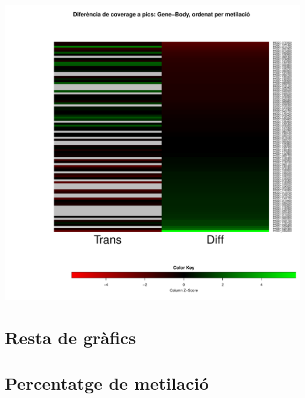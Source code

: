 \documentclass{article}\usepackage[]{graphicx}\usepackage[]{color}
\newenvironment{knitrout}{}{} %
\begin{document}
\begin{knitrout}
\color{fgcolor}

{\centering \includegraphics[width=.9\linewidth]{figure/minimal-heat_difpeak_cov_dif_metord-1} 

}



\end{knitrout}
\clearpage
\section{Resta de gràfics}
\section{Percentatge de metilació}
\end{document}
